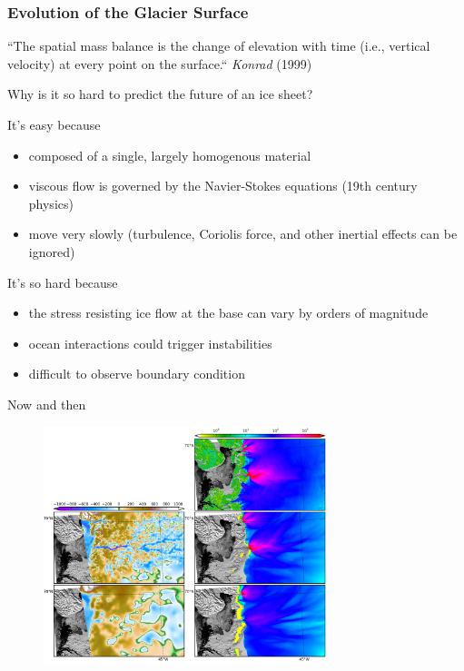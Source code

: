 \documentclass[hide notes,intlimits,unknownkeysallowed]{beamer}
\begin{document}
\begin{frame}
  \frametitle{Evolution of the Glacier Surface}
 ``The spatial mass balance is the change of elevation with time
 (i.e., vertical velocity) at every point on the surface.``
 \emph{Konrad} (1999)
\end{frame}

\begin{frame}{Why is it so hard to predict the future of an ice
    sheet?}
  \vspace{-.5em}
  \begin{block}{It's easy because}
   \begin{itemize}
    \item composed of a single, largely homogenous material
    \item viscous flow is governed by the Navier-Stokes equations (19th century physics)
    \item move very slowly (turbulence, Coriolis force, and other inertial effects can be ignored)
   \end{itemize}
  \end{block}
  \begin{block}{It's so hard because}
   \begin{itemize}
    \item the stress resisting ice flow at the base can vary by orders of magnitude
    \item ocean interactions could trigger instabilities
    \item difficult to observe boundary condition
  \end{itemize}
  \end{block}
\end{frame}

\begin{frame}{Now and then}
     \begin{figure}
       \includegraphics[width=8.25cm]{figures/bed_elev_speeds}
     \end{figure}
\end{frame}
\end{document}
